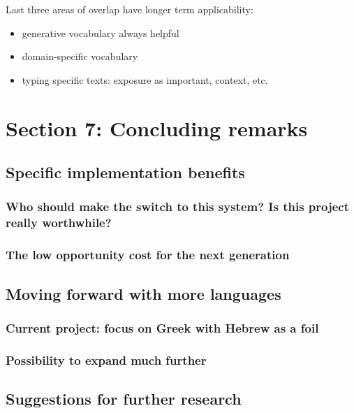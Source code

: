 \documentclass[11pt]{article}
\begin{document}
Last three areas of overlap have longer term applicability:

\begin{itemize}
\item generative vocabulary always helpful
\item domain-specific vocabulary
\item typing specific texts: exposure as important, context, etc.
\end{itemize}

\section{Section 7: Concluding remarks}
\label{sec:org2cbee3c}

\subsection{Specific implementation benefits}
\label{sec:org1500a3e}

\subsubsection{Who should make the switch to this system? Is this project really worthwhile?}
\label{sec:orgec67da6}

\subsubsection{The low opportunity cost for the next generation}
\label{sec:org6fb2df8}

\subsection{Moving forward with more languages}
\label{sec:orgca330ca}

\subsubsection{Current project: focus on Greek with Hebrew as a foil}
\label{sec:org2d951ac}

\subsubsection{Possibility to expand much further}
\label{sec:org026888e}

\subsection{Suggestions for further research}
\label{sec:orge5d810e}
\end{document}
